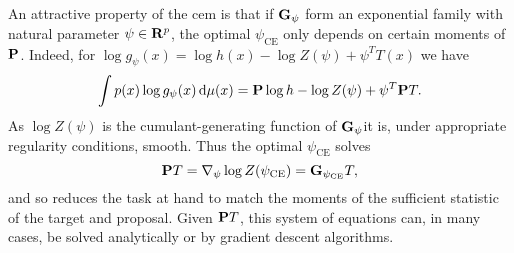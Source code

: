 %
%
%
%
%
%    

An attractive property of the \gls{cem} is that if $\G_{\psi}$ form an exponential family with natural parameter $\psi \in \R^{p}$, the optimal $\psi_{\text{CE}}$ only depends on certain moments of $\P$. Indeed, for $\log g_{\psi}(x) = \log h(x) - \log Z(\psi) + \psi^{T} T(x)$ we have 
$$
\int p(x) \log g_{\psi}(x) \d \mu(x) = \P \log h - \log Z(\psi) + \psi^{T} \P T.
$$
 As $\log Z(\psi)$ is the cumulant-generating function of $\G_{\psi}$it is, under appropriate regularity conditions, smooth. Thus the optimal $\psi_{\text{CE}}$ solves
$$
\P T = \nabla_{\psi} \log Z(\pce) = \G_{\pce}T,
$$
and so reduces the task at hand to match the moments of the sufficient statistic of the target and proposal.
Given $\P T$, this system of equations can, in many cases, be solved analytically or by gradient descent algorithms.

